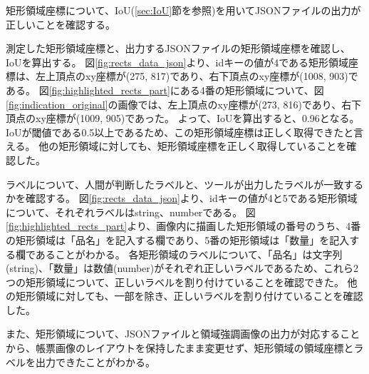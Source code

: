 矩形領域座標について、IoU(\ref{sec:IoU}節を参照)を用いてJSONファイルの出力が正しいことを確認する。

測定した矩形領域座標と、出力するJSONファイルの矩形領域座標を確認し、IoUを算出する。
図\ref{fig:rects_data_json}より、idキーの値が4である矩形領域座標は、左上頂点のxy座標が(275, 817)であり、右下頂点のxy座標が(1008, 903)である。
図\ref{fig:highlighted_rects_part}にある4番の矩形領域について、図\ref{fig:indication_original}の画像では、左上頂点のxy座標が(273, 816)であり、右下頂点のxy座標が(1009, 905)であった。
よって、IoUを算出すると、0.96となる。
IoUが閾値である0.5以上であるため、この矩形領域座標は正しく取得できたと言える。
他の矩形領域に対しても、矩形領域座標を正しく取得していることを確認した。

ラベルについて、人間が判断したラベルと、ツールが出力したラベルが一致するかを確認する。
図\ref{fig:rects_data_json}より、idキーの値が4と5である矩形領域について、それぞれラベルはstring、numberである。
図\ref{fig:highlighted_rects_part}より、画像内に描画した矩形領域の番号のうち、4番の矩形領域は「品名」を記入する欄であり、5番の矩形領域は「数量」を記入する欄であることがわかる。
各矩形領域のラベルについて、「品名」は文字列(string)、「数量」は数値(number)がそれぞれ正しいラベルであるため、これら2つの矩形領域について、正しいラベルを割り付けていることを確認できた。
他の矩形領域に対しても、一部を除き、正しいラベルを割り付けていることを確認した。

また、矩形領域について、JSONファイルと領域強調画像の出力が対応することから、帳票画像のレイアウトを保持したまま変更せず、矩形領域の領域座標とラベルを出力できたことがわかる。

